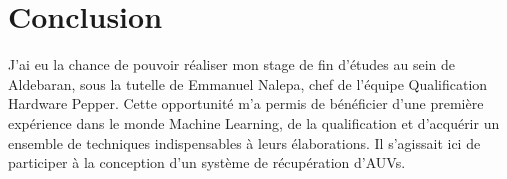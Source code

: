 \chapter{Conclusion}
\label{Conclusion}
\thispagestyle{fancy}

J'ai eu la chance de pouvoir réaliser mon stage de fin d'études au sein de Aldebaran, sous la tutelle de Emmanuel Nalepa, chef de l'équipe Qualification Hardware Pepper. Cette opportunité m’a permis de bénéficier d’une première expérience dans le monde Machine Learning, de la qualification et d’acquérir un ensemble de techniques indispensables à leurs élaborations. Il s’agissait ici de participer à la conception d’un système de récupération d’AUVs.